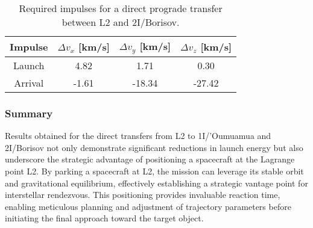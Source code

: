 \vspace{1cm}
\begin{table}[H]
  \centering
  \begin{tabular}{|c|c|c|c|}
    \hline
    Impulse & $\Delta v_x$ [km/s] & $\Delta v_y$ [km/s] & $\Delta v_z$ [km/s] \\
    \hline
    Launch  & 4.82                & 1.71                & 0.30                \\
    \hline
    Arrival & -1.61               & -18.34              & -27.42              \\
    \hline
  \end{tabular}
  \caption[Required impulses for a direct prograde transfer between L2 and
    2I/Borisov]{Required impulses for a direct prograde transfer between L2 and
    2I/Borisov.}
  \label{tab:l2-borisov-direct-transfer-impulses}
\end{table}

\subsubsection{Summary}

Results obtained for the direct transfers from L2 to 1I/'Oumuamua and 2I/Borisov
not only demonstrate significant reductions in launch energy but also underscore
the strategic advantage of positioning a spacecraft at the Lagrange point L2. By
parking a spacecraft at L2, the mission can leverage its stable orbit and
gravitational equilibrium, effectively establishing a strategic vantage point
for interstellar rendezvous. This positioning provides invaluable reaction time,
enabling meticulous planning and adjustment of trajectory parameters before
initiating the final approach toward the target object.
